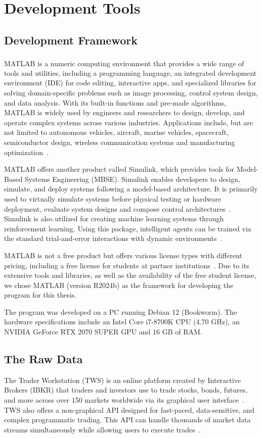 \documentclass[a4paper,oneside,onecolumn,12pt]{book}
\begin{document}
\section{Development Tools}
	\subsection{Development Framework}
	MATLAB\textsuperscript{\textcopyright} is a numeric computing environment that provides a wide range of tools and utilities, including a programming language, an integrated development environment (IDE) for code editing, interactive apps, and specialized libraries for solving domain-specific problems such as image processing, control system design, and data analysis. With its built-in functions and pre-made algorithms, MATLAB is widely used by engineers and researchers to design, develop, and operate complex systems across various industries. Applications include, but are not limited to autonomous vehicles, aircraft, marine vehicles, spacecraft, semiconductor design, wireless communication systems and manufacturing optimization~\cite{WhatIsMATLAB}.

	MATLAB offers another product called Simulink, which provides tools for Model-Based Systems Engineering (MBSE). Simulink enables developers to design, simulate, and deploy systems following a model-based architecture. It is primarily used to virtually simulate systems before physical testing or hardware deployment, evaluate system designs and compose control architectures~\cite{WhatIsSimulink}. Simulink is also utilized for creating machine learning systems through reinforcement learning. Using this package, intelligent agents can be trained via the standard trial-and-error interactions with dynamic environments~\cite{SimulinkAI}. 

	MATLAB is not a free product but offers various license types with different pricing, including a free license for students at partner institutions~\cite{MATLABPricing}. Due to its extensive tools and libraries, as well as the availability of the free student license, we chose MATLAB (version R2024b) as the framework for developing the program for this thesis.

	The program was developed on a PC running Debian 12 (Bookworm). The hardware specifications include an Intel Core i7-8700K CPU (4.70 GHz), an NVIDIA GeForce RTX 2070 SUPER GPU and 16 GB of RAM.

	\subsection{The Raw Data}
	The Trader Workstation (TWS) is an online platform created by Interactive Brokers (IBKR) that traders and investors use to trade stocks, bonds, futures, and more across over 150 markets worldwide via its graphical user interface~\cite{TW}. TWS also offers a non-graphical API designed for fast-paced, data-sensitive, and complex programmatic trading. This API can handle thousands of market data streams simultaneously while allowing users to execute trades~\cite{IBKRAPI}.
\end{document}
